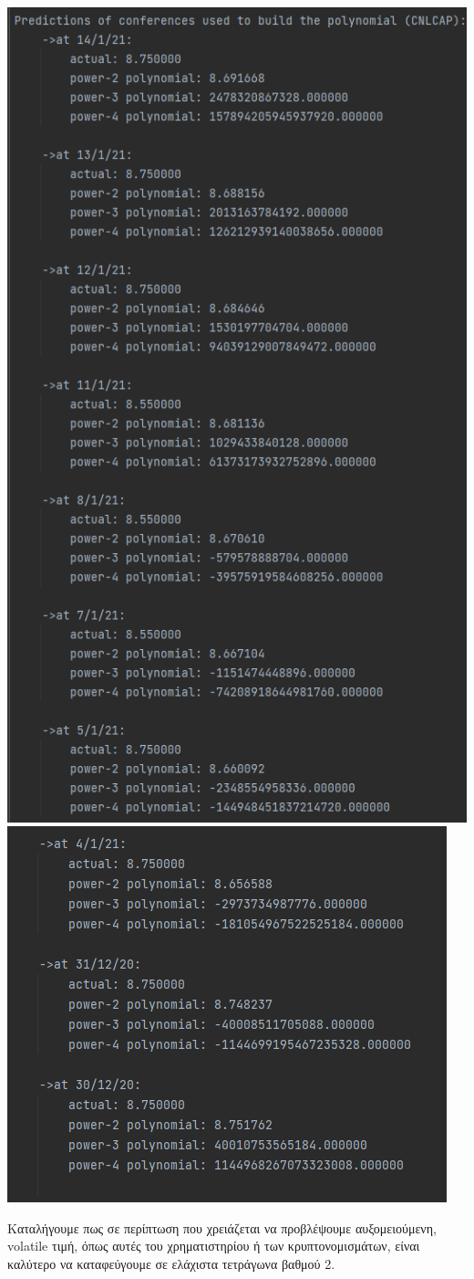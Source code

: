 \documentclass{article}
\newcommand{\lt}{\latintext}
\newcommand{\gt}{\greektext}
\begin{document}
\begin{center}
    \includegraphics[scale=0.7]{images/cnlcap_past.png}
    \includegraphics[scale=0.7]{images/cnlcap_past1.png}
\end{center}

\gt Καταλήγουμε πως σε περίπτωση που χρειάζεται να προβλέψουμε αυξομειούμενη,
\lt volatile \gt τιμή, όπως αυτές του χρηματιστηρίου ή των κρυπτονομισμάτων,
\gt είναι καλύτερο να καταφεύγουμε σε ελάχιστα τετράγωνα βαθμού 2.
\end{document}
